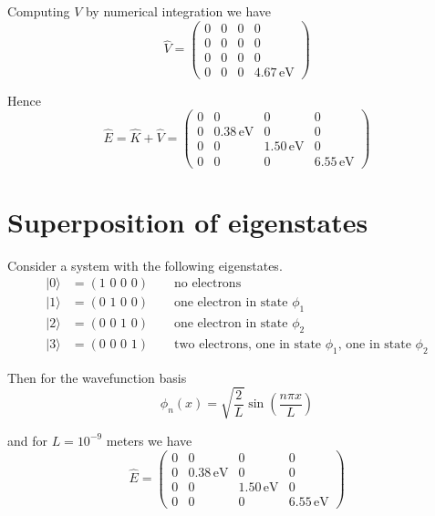 \documentclass[12pt]{article}
\begin{document}
\noindent
Computing $V$ by numerical integration we have
\begin{equation*}
\hat{V}=\begin{pmatrix}
0 & 0 & 0 & 0\\
0 & 0 & 0 & 0\\
0 & 0 & 0 & 0\\
0 & 0 & 0 & 4.67\,\text{eV}
\end{pmatrix}
\end{equation*}

\noindent
Hence
\begin{equation*}
\hat{E}=\hat{K}+\hat{V}=\begin{pmatrix}
0 & 0 & 0 & 0\\
0 & 0.38\,\text{eV} & 0 & 0\\
0 & 0 & 1.50\,\text{eV} & 0\\
0 & 0 & 0 & 6.55\,\text{eV}
\end{pmatrix}
\end{equation*}

\newpage

\section{Superposition of eigenstates}
Consider a system with the following eigenstates.
\begin{align*}
|0\rangle&=(\text{1 0 0 0})\qquad\text{no electrons}\\
|1\rangle&=(\text{0 1 0 0})\qquad\text{one electron in state $\phi_1$}\\
|2\rangle&=(\text{0 0 1 0})\qquad\text{one electron in state $\phi_2$}\\
|3\rangle&=(\text{0 0 0 1})\qquad\text{two electrons, one in state $\phi_1$, one in state $\phi_2$}
\end{align*}

\noindent
Then for the wavefunction basis
\begin{equation*}
\phi_n(x)=\sqrt{\frac{2}{L}}\sin\left(\frac{n\pi x}{L}\right)
\end{equation*}

\noindent
and for $L=10^{-9}$ meters we have
\begin{equation*}
\hat{E}=\begin{pmatrix}
0&0&0&0\\
0&0.38\,\text{eV}&0&0\\
0&0&1.50\,\text{eV}&0\\
0&0&0&6.55\,\text{eV}
\end{pmatrix}
\end{equation*}
\end{document}
